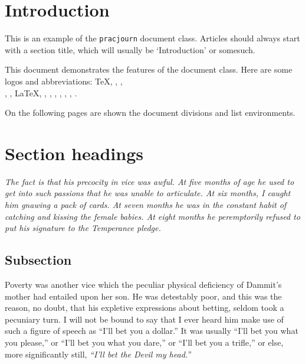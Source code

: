 \documentclass{pracjourn}
\begin{document}
\maketitle
\restoregeometry
\newpage

\tableofcontents
\newpage

\section{Introduction}
This is an example of the \texttt{pracjourn} document class.
Articles should always start with a section title, which will usually be `Introduction' or somesuch.

This document demonstrates the features of the document class.
Here are some logos and abbreviations:
\TeX, \pdfTeX, \BibTeX,\\ \MF, \MP, \LaTeX, \LaTeXe,
\mbox{\ConTeXt}, \pdfLaTeX, \XeTeX, \PracTeX, \TPJ, \PS.

On the following pages are shown the document divisions and list environments.

\section{Section headings}
\itshape The fact is that his precocity in vice was awful. At five months of age he
used to get into such passions that he was unable to articulate. At six
months, I caught him gnawing a pack of cards. At seven months he was in
the constant habit of catching and kissing the female babies. At eight
months he peremptorily refused to put his signature to the Temperance
pledge.

\subsection{Subsection}

Poverty was another vice which the peculiar physical deficiency of
Dammit's mother had entailed upon her son. He was detestably poor, and
this was the reason, no doubt, that his expletive expressions about
betting, seldom took a pecuniary turn. I will not be bound to say that I
ever heard him make use of such a figure of speech as ``I'll bet you a
dollar.'' It was usually ``I'll bet you what you please,'' or ``I'll bet you
what you dare,'' or ``I'll bet you a trifle,'' or else, more significantly
still, \emph{``I'll bet the Devil my head.''}
\end{document}
